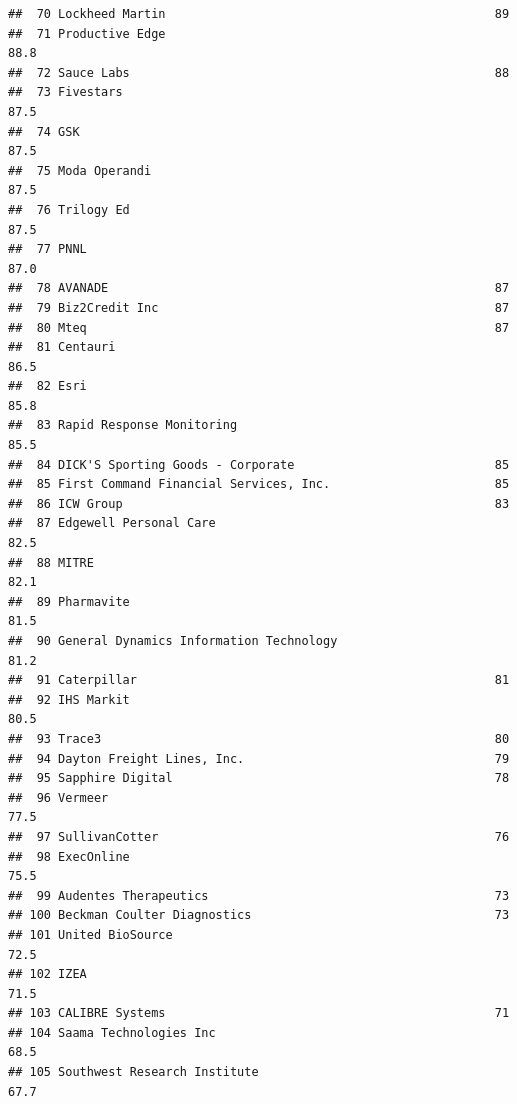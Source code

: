 \documentclass[
]{article}
\begin{document}
\begin{verbatim}
##  70 Lockheed Martin                                              89  
##  71 Productive Edge                                              88.8
##  72 Sauce Labs                                                   88  
##  73 Fivestars                                                    87.5
##  74 GSK                                                          87.5
##  75 Moda Operandi                                                87.5
##  76 Trilogy Ed                                                   87.5
##  77 PNNL                                                         87.0
##  78 AVANADE                                                      87  
##  79 Biz2Credit Inc                                               87  
##  80 Mteq                                                         87  
##  81 Centauri                                                     86.5
##  82 Esri                                                         85.8
##  83 Rapid Response Monitoring                                    85.5
##  84 DICK'S Sporting Goods - Corporate                            85  
##  85 First Command Financial Services, Inc.                       85  
##  86 ICW Group                                                    83  
##  87 Edgewell Personal Care                                       82.5
##  88 MITRE                                                        82.1
##  89 Pharmavite                                                   81.5
##  90 General Dynamics Information Technology                      81.2
##  91 Caterpillar                                                  81  
##  92 IHS Markit                                                   80.5
##  93 Trace3                                                       80  
##  94 Dayton Freight Lines, Inc.                                   79  
##  95 Sapphire Digital                                             78  
##  96 Vermeer                                                      77.5
##  97 SullivanCotter                                               76  
##  98 ExecOnline                                                   75.5
##  99 Audentes Therapeutics                                        73  
## 100 Beckman Coulter Diagnostics                                  73  
## 101 United BioSource                                             72.5
## 102 IZEA                                                         71.5
## 103 CALIBRE Systems                                              71  
## 104 Saama Technologies Inc                                       68.5
## 105 Southwest Research Institute                                 67.7

\end{verbatim}
\end{document}
